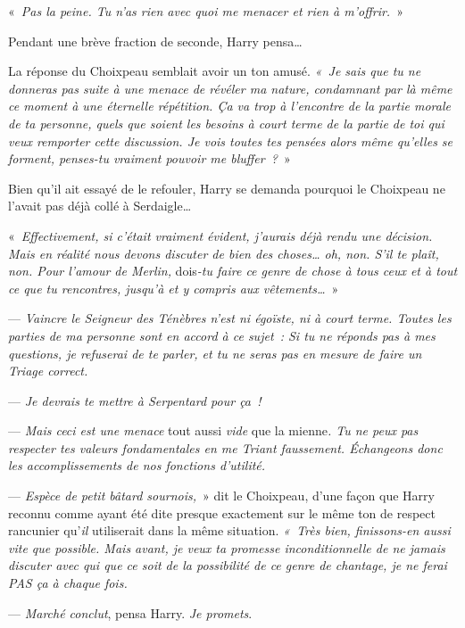 «~\emph{Pas la peine. Tu n'as rien avec quoi me menacer et rien à m'offrir.}~»

Pendant une brève fraction de seconde, Harry pensa…

La réponse du Choixpeau semblait avoir un ton amusé. \emph{«~Je sais que tu ne donneras pas suite à une menace de révéler ma nature, condamnant par là même ce moment à une éternelle répétition. Ça va trop à l'encontre de la partie morale de ta personne, quels que soient les besoins à court terme de la partie de toi qui veux remporter cette discussion. Je vois toutes tes pensées alors même qu'elles se forment, penses-tu vraiment pouvoir me bluffer~?}~»

Bien qu'il ait essayé de le refouler, Harry se demanda pourquoi le Choixpeau ne l'avait pas déjà collé à Serdaigle…

«~\emph{Effectivement, si c'était vraiment évident, j'aurais déjà rendu une décision. Mais en réalité nous devons discuter de bien des choses… oh, non. S'il te plaît, non. Pour l'amour de Merlin,} dois\emph{-tu faire ce genre de chose à tous ceux et à tout ce que tu rencontres, jusqu'à et y compris aux vêtements…}~»

--- \emph{Vaincre le Seigneur des Ténèbres n'est ni égoïste, ni à court terme. Toutes les parties de ma personne sont en accord à ce sujet~: Si tu ne réponds pas à mes questions, je refuserai de te parler, et tu ne seras pas en mesure de faire un Triage correct.}

--- \emph{Je devrais te mettre à Serpentard pour ça~!}

--- \emph{Mais ceci est une menace} tout aussi \emph{vide} que la mienne\emph{. Tu ne peux pas respecter tes valeurs fondamentales en me Triant faussement. Échangeons donc les accomplissements de nos fonctions d'utilité.}

--- \emph{Espèce de petit bâtard sournois,}~» dit le Choixpeau, d'une façon que Harry reconnu comme ayant été dite presque exactement sur le même ton de respect rancunier qu'\emph{il} utiliserait dans la même situation. \emph{«~Très bien, finissons-en aussi vite que possible. Mais avant, je veux ta promesse inconditionnelle de ne jamais discuter avec qui que ce soit de la possibilité de ce genre de chantage, je ne ferai PAS ça à chaque fois.}

--- \emph{Marché conclut}, pensa Harry. \emph{Je promets}.

